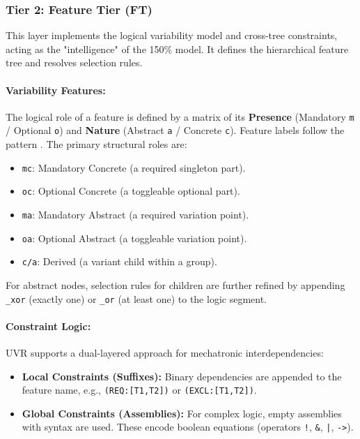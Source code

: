 \documentclass[runningheads]{llncs}
\begin{document}
\subsubsection{Tier 2: Feature Tier (FT)}
This layer implements the logical variability model and cross-tree constraints, acting as the "intelligence" of the 150\% model. It defines the hierarchical feature tree and resolves selection rules.

\paragraph{Variability Features:}
The logical role of a feature is defined by a matrix of its \textbf{Presence} (Mandatory \texttt{m} / Optional \texttt{o}) and \textbf{Nature} (Abstract \texttt{a} / Concrete \texttt{c}). Feature labels follow the pattern . The primary structural roles are:
\begin{itemize}
    \item \texttt{mc}: Mandatory Concrete (a required singleton part).
    \item \texttt{oc}: Optional Concrete (a toggleable optional part).
    \item \texttt{ma}: Mandatory Abstract (a required variation point).
    \item \texttt{oa}: Optional Abstract (a toggleable variation point).
    \item \texttt{c/a}: Derived (a variant child within a group).
\end{itemize}
For abstract nodes, selection rules for children are further refined by appending \texttt{\_xor} (exactly one) or \texttt{\_or} (at least one) to the logic segment.

\paragraph{Constraint Logic:}
UVR supports a dual-layered approach for mechatronic interdependencies:
\begin{itemize}
    \item \textbf{Local Constraints (Suffixes):} Binary dependencies are appended to the feature name, e.g., \texttt{(REQ:[T1,T2])} or \texttt{(EXCL:[T1,T2])}.
    \item \textbf{Global Constraints (Assemblies):} For complex logic, empty assemblies with syntax  are used. These encode boolean equations (operators \texttt{!}, \texttt{\&}, \texttt{|}, \texttt{->}).
\end{itemize}
\end{document}
